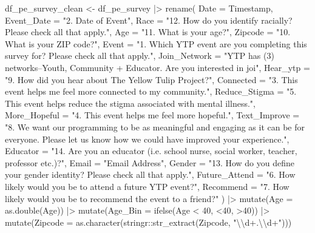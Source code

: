 \documentclass[
  letterpaper,
  DIV=11,
  numbers=noendperiod]{scrartcl}
\newenvironment{Shaded}{\begin{snugshade}}{\end{snugshade}}
\newcommand{\AttributeTok}[1]{\textcolor[rgb]{0.40,0.45,0.13}{#1}}
\newcommand{\DecValTok}[1]{\textcolor[rgb]{0.68,0.00,0.00}{#1}}
\newcommand{\FunctionTok}[1]{\textcolor[rgb]{0.28,0.35,0.67}{#1}}
\newcommand{\NormalTok}[1]{\textcolor[rgb]{0.00,0.23,0.31}{#1}}
\newcommand{\OtherTok}[1]{\textcolor[rgb]{0.00,0.23,0.31}{#1}}
\newcommand{\SpecialCharTok}[1]{\textcolor[rgb]{0.37,0.37,0.37}{#1}}
\newcommand{\StringTok}[1]{\textcolor[rgb]{0.13,0.47,0.30}{#1}}
\begin{document}
\begin{Shaded}
\begin{Highlighting}[]
\NormalTok{df\_pe\_survey\_clean }\OtherTok{\textless{}{-}}
\NormalTok{  df\_pe\_survey }\SpecialCharTok{|\textgreater{}} 
  \FunctionTok{rename}\NormalTok{(}
    \AttributeTok{Date =}\NormalTok{ Timestamp,}
    \AttributeTok{Event\_Date =} \StringTok{"2. Date of Event"}\NormalTok{,}
    \AttributeTok{Race =} \StringTok{"12. How do you identify racially? Please check all that apply."}\NormalTok{,}
    \AttributeTok{Age =} \StringTok{"11. What is your age?"}\NormalTok{,}
    \AttributeTok{Zipcode =} \StringTok{"10. What is your ZIP code?"}\NormalTok{,}
    \AttributeTok{Event =} \StringTok{"1. Which YTP event are you completing this survey for? Please check all that apply."}\NormalTok{,}
    \AttributeTok{Join\_Network =} \StringTok{"YTP has (3) networks–Youth, Community + Educator. Are you interested in joi"}\NormalTok{,}
    \AttributeTok{Hear\_ytp =} \StringTok{"9. How did you hear about The Yellow Tulip Project?"}\NormalTok{,}
    \AttributeTok{Connected =} \StringTok{"3. This event helps me feel more connected to my community."}\NormalTok{,}
    \AttributeTok{Reduce\_Stigma =} \StringTok{"5. This event helps reduce the stigma associated with mental illness."}\NormalTok{,}
    \AttributeTok{More\_Hopeful =} \StringTok{"4. This event helps me feel more hopeful."}\NormalTok{,}
    \AttributeTok{Text\_Improve =} \StringTok{"8. We want our programming to be as meaningful and engaging as it can be for everyone. Please let us know how we could have improved your experience."}\NormalTok{,}
    \AttributeTok{Educator =} \StringTok{"14. Are you an educator (i.e. school nurse, social worker, teacher, professor etc.)?"}\NormalTok{,}
    \AttributeTok{Email =} \StringTok{"Email Address"}\NormalTok{,}
    \AttributeTok{Gender =} \StringTok{"13. How do you define your gender identity? Please check all that apply."}\NormalTok{,}
    \AttributeTok{Future\_Attend =} \StringTok{"6. How likely would you be to attend a future YTP event?"}\NormalTok{,}
    \AttributeTok{Recommend =} \StringTok{"7. How likely would you be to recommend the event to a friend?"}
\NormalTok{  ) }\SpecialCharTok{|\textgreater{}} 
  \FunctionTok{mutate}\NormalTok{(}\AttributeTok{Age =} \FunctionTok{as.double}\NormalTok{(Age)) }\SpecialCharTok{|\textgreater{}} 
  \FunctionTok{mutate}\NormalTok{(}\AttributeTok{Age\_Bin =} \FunctionTok{ifelse}\NormalTok{(Age }\SpecialCharTok{\textless{}} \DecValTok{40}\NormalTok{, }\StringTok{\textquotesingle{}\textless{}40\textquotesingle{}}\NormalTok{, }\StringTok{\textquotesingle{}\textgreater{}40\textquotesingle{}}\NormalTok{)) }\SpecialCharTok{|\textgreater{}} 
  \FunctionTok{mutate}\NormalTok{(}\AttributeTok{Zipcode =} \FunctionTok{as.character}\NormalTok{(stringr}\SpecialCharTok{::}\FunctionTok{str\_extract}\NormalTok{(Zipcode, }\StringTok{"}\SpecialCharTok{\textbackslash{}\textbackslash{}}\StringTok{d+.}\SpecialCharTok{\textbackslash{}\textbackslash{}}\StringTok{d+"}\NormalTok{)))}
\end{Highlighting}
\end{Shaded}
\end{document}
